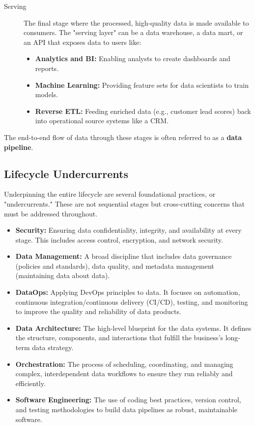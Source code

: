 \documentclass{article}
\begin{document}
\begin{description}
    \item[Serving] The final stage where the processed, high-quality data is made available to consumers. The "serving layer" can be a data warehouse, a data mart, or an API that exposes data to users like:
    \begin{itemize}
        \item \textbf{Analytics and BI:} Enabling analysts to create dashboards and reports.
        \item \textbf{Machine Learning:} Providing feature sets for data scientists to train models.
        \item \textbf{Reverse ETL:} Feeding enriched data (e.g., customer lead scores) back into operational source systems like a CRM.
    \end{itemize}
\end{description}
The end-to-end flow of data through these stages is often referred to as a \textbf{data pipeline}.

\subsection{Lifecycle Undercurrents}
Underpinning the entire lifecycle are several foundational practices, or "undercurrents." These are not sequential stages but cross-cutting concerns that must be addressed throughout.
\begin{itemize}
    \item \textbf{Security:} Ensuring data confidentiality, integrity, and availability at every stage. This includes access control, encryption, and network security.
    \item \textbf{Data Management:} A broad discipline that includes data governance (policies and standards), data quality, and metadata management (maintaining data about data).
    \item \textbf{DataOps:} Applying DevOps principles to data. It focuses on automation, continuous integration/continuous delivery (CI/CD), testing, and monitoring to improve the quality and reliability of data products.
    \item \textbf{Data Architecture:} The high-level blueprint for the data systems. It defines the structure, components, and interactions that fulfill the business's long-term data strategy.
    \item \textbf{Orchestration:} The process of scheduling, coordinating, and managing complex, interdependent data workflows to ensure they run reliably and efficiently.
    \item \textbf{Software Engineering:} The use of coding best practices, version control, and testing methodologies to build data pipelines as robust, maintainable software.
\end{itemize}
\end{document}
